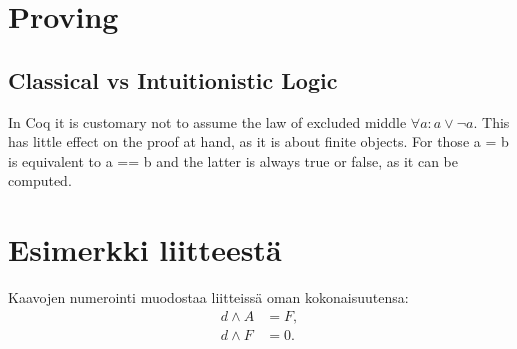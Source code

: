 \documentclass[english, 12pt, a4paper, sci, a-1b, online]{aaltothesis}
\begin{document}
\section{Proving}

\subsection{Classical vs Intuitionistic Logic}

In Coq it is customary not to assume the law of excluded middle $\forall a : a \lor \lnot a$. This has little effect on the proof at hand, as it is about finite objects. For those a = b is equivalent to a == b and the latter is always true or false, as it can be computed.

\clearpage
\thesisbibliography{}




\clearpage
\thesisappendix{}

\section{Esimerkki liitteestä\label{LiiteA}}

Kaavojen numerointi muodostaa liitteissä oman kokonaisuutensa:
\begin{align}
d \wedge A &= F, \label{liitekaava1}\\
d \wedge F &= 0. \label{liitekaava2}
\end{align}
\end{document}
